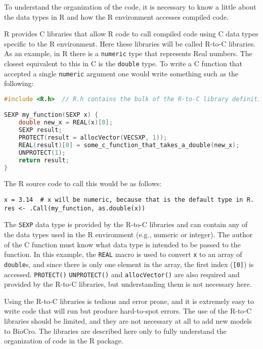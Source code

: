 \documentclass{article}
\newcommand{\code}[1]{\texttt{#1}}
\begin{document}
To understand the organization of the code, it is necessary to know a little about the data types in R and how the R environment accesses compiled code.

R provides C libraries that allow R code to call compiled code using C data types specific to the R environment. Here these libraries will be called R-to-C libraries. As an example, in R there is a \code{numeric} type that represents Real numbers. The closest equivalent to this in C is the \code{double} type. To write a C function that accepted a single \code{numeric} argument one would write something such as the following:

\begin{center}
\begin{lstlisting}[language=c]
#include <R.h>  // R.h contains the bulk of the R-to-C library definitions.

SEXP my_function(SEXP x) {
    double new_x = REAL(x)[0];
    SEXP result;
    PROTECT(result = allocVector(VECSXP, 1));
    REAL(result)[0] = some_c_function_that_takes_a_double(new_x);
    UNPROTECT(1);
    return result;
}
\end{lstlisting}
\end{center}

The R source code to call this would be as follows:

\begin{center}
\begin{lstlisting}
x = 3.14  # x will be numeric, because that is the default type in R.
res <- .Call(my_function, as.double(x))
\end{lstlisting}
\end{center}

The \code{SEXP} data type is provided by the R-to-C libraries and can contain any of the data types used in the R environment (e.g., numeric or integer). The author of the C function must know what data type is intended to be passed to the function. In this example, the \code{REAL} macro is used to convert \code{x} to an array of \code{double}s, and since there is only one element in the array, the first index (\code{[0]}) is accessed. \code{PROTECT()} \code{UNPROTECT()} and \code{allocVector()} are also required and provided by the R-to-C libraries, but understanding them is not necessary here. 

Using the R-to-C libraries is tedious and error prone, and it is extremely easy to write code that will run but produce hard-to-spot errors. The use of the R-to-C libraries should be limited, and they are not necessary at all to add new models to BioCro. The libraries are described here only to fully understand the organization of code in the R package.
\end{document}
